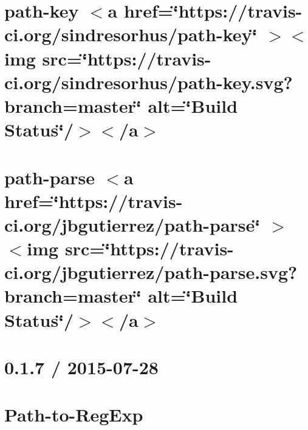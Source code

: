\documentclass[twoside]{book}
\newcommand{\+}{\discretionary{\mbox{\scriptsize$\hookleftarrow$}}{}{}}
\begin{document}
\chapter{path-\/key \texorpdfstring{$<$}{<}a href=\char`\"{}https\+://travis-\/ci.\+org/sindresorhus/path-\/key\char`\"{} \texorpdfstring{$>$}{>}\texorpdfstring{$<$}{<}img src=\char`\"{}https\+://travis-\/ci.\+org/sindresorhus/path-\/key.\+svg?branch=master\char`\"{} alt=\char`\"{}\+Build Status\char`\"{}/\texorpdfstring{$>$}{>}\texorpdfstring{$<$}{<}/a\texorpdfstring{$>$}{>}}
\label{md__c___users_vaishnavi_jadhav__desktop__developer_code_mean_stack_example_client_node_modules_path_key_readme}

\chapter{path-\/parse \texorpdfstring{$<$}{<}a href=\char`\"{}https\+://travis-\/ci.\+org/jbgutierrez/path-\/parse\char`\"{} \texorpdfstring{$>$}{>}\texorpdfstring{$<$}{<}img src=\char`\"{}https\+://travis-\/ci.\+org/jbgutierrez/path-\/parse.\+svg?branch=master\char`\"{} alt=\char`\"{}\+Build Status\char`\"{}/\texorpdfstring{$>$}{>}\texorpdfstring{$<$}{<}/a\texorpdfstring{$>$}{>}}
\label{md__c___users_vaishnavi_jadhav__desktop__developer_code_mean_stack_example_client_node_modules_path_parse__r_e_a_d_m_e}

\chapter{0.1.7 / 2015-\/07-\/28}
\label{md__c___users_vaishnavi_jadhav__desktop__developer_code_mean_stack_example_client_node_modules_path_to_regexp__history}

\chapter{Path-\/to-\/\+Reg\+Exp}
\label{md__c___users_vaishnavi_jadhav__desktop__developer_code_mean_stack_example_client_node_modules_path_to_regexp__readme}

\end{document}
